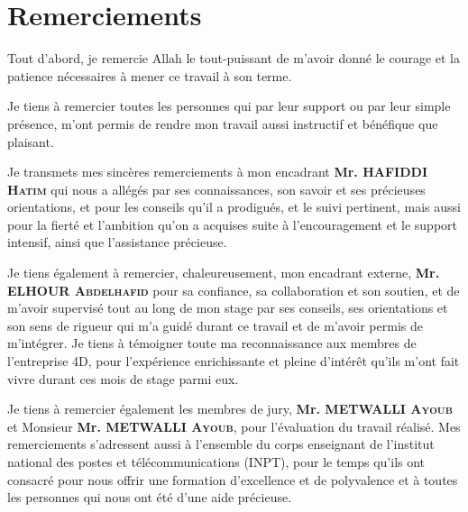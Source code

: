 \chapter*{Remerciements}


\hspace{0.6cm}Tout d’abord, je remercie Allah le tout-puissant de m’avoir donné le courage et la patience nécessaires à mener ce travail à son terme.

\vspace{10pt}
Je tiens à remercier toutes les personnes qui par leur support ou par leur simple présence, m'ont permis de rendre mon travail aussi instructif et bénéfique que plaisant.

\vspace{10pt}
Je transmets mes sincères remerciements à mon encadrant \textbf{Mr. HAFIDDI \textsc{Hatim}} qui nous a allégés par ses connaissances, son savoir et ses précieuses orientations, et pour les conseils qu’il a prodigués, et le suivi pertinent, mais aussi pour la fierté et l’ambition qu’on a acquises suite à l’encouragement et le support intensif, ainsi que l’assistance précieuse.

\vspace{10pt}
Je tiens également à remercier, chaleureusement, mon encadrant externe, \textbf{Mr. ELHOUR \textsc{Abdelhafid}} pour sa confiance, sa collaboration et son soutien, et de m’avoir supervisé tout au long de mon stage par ses conseils, ses orientations et son sens de rigueur qui m’a guidé durant ce travail et de m’avoir permis de m’intégrer. Je tiens à témoigner toute ma reconnaissance aux membres de l’entreprise 4D, pour l’expérience enrichissante et pleine d’intérêt qu’ils m’ont fait vivre durant ces mois de stage parmi eux.

\vspace{10pt}
Je tiens à remercier également les membres de jury, \textbf{Mr. METWALLI \textsc{Ayoub}} et Monsieur \textbf{Mr. METWALLI \textsc{Ayoub}}, pour l’évaluation du travail réalisé. Mes remerciements s’adressent aussi à l’ensemble du corps enseignant de l’institut national des postes et télécommunications (INPT), pour le temps qu’ils ont consacré pour nous offrir une formation d’excellence et de polyvalence et à toutes les personnes qui nous ont été d’une aide précieuse.
